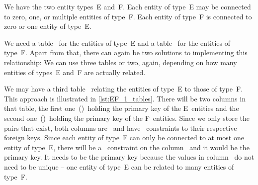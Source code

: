 %
%
\label{sec:rm:ef}%
%
%
%
%
%
%
%
%
%
%
We have the two entity types~E and~F.
Each entity of type~E may be connected to zero, one, or multiple entities of type~F.
Each entity of type~F is connected to zero or one entity of type~E.

We need a table~ for the entities of type~E and a table~ for the entities of type~F.
Apart from that, there can again be two solutions to implementing this relationship:
We can use three tables or two, again, depending on how many entities of types~E and~F are actually related.

We may have a third table~ relating the entities of type~E to those of type~F.
This approach is illustrated in \cref{lst:EF_1_tables}.
There will be two columns in that table, the first one~()~holding the primary key of the E~entities and the second one~()~holding the primary key of the F~entities.
Since we only store the pairs that exist, both columns are~ and have~ constraints to their respective foreign keys.
Since each entity of type~F can only be connected to at most one entity of type~E, there will be a~ constraint on the column~ and it would be the primary key.
It needs to be the primary key because the values in column~ do not need to be unique -- one entity of type~E can be related to many entities of type~F.

